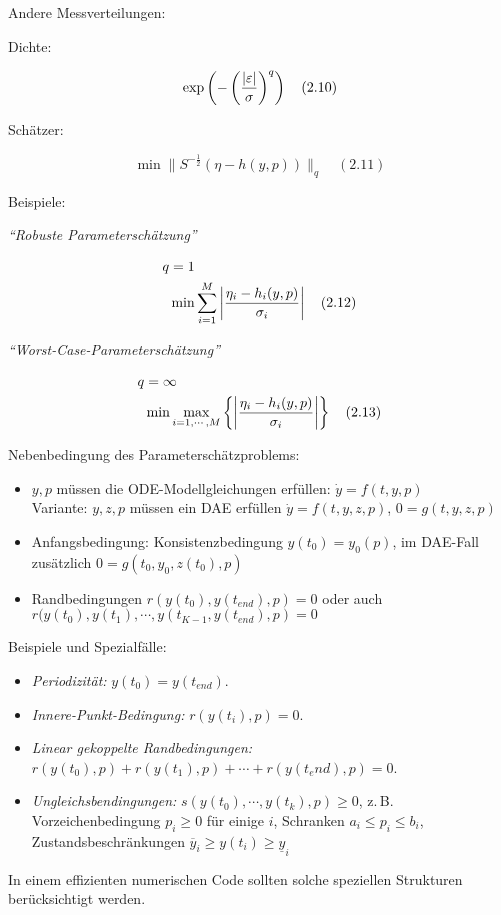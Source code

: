 Andere Messverteilungen:

Dichte:

\[\exp\left(-\left(\frac{|\varepsilon|}{\sigma}\right)^q\right) \quad (2.10)\]

Schätzer:

\[ \min \|S^{-\frac 12} (\eta-h(y,p)) \|_q \quad (2.11)\]

Beispiele:

\emph{"`Robuste Parameterschätzung"'}

\begin{align*}
q &= 1 \\
& \min \sum_{i=1}^M \left| \frac{\eta_i-h_i(y,p)}{\sigma_i} \right| \quad (2.12)
\end{align*}


\emph{"`Worst-Case-Parameterschätzung"'}

\begin{align*}
q &= \infty \\
& \min \max_{i=1,\cdots,M} \left\{ \left| \frac{\eta_i-h_i(y,p)}{\sigma_i} \right| \right\} \quad (2.13)
\end{align*}

Nebenbedingung des Parameterschätzproblems:

\begin{itemize}
\item $y,p$ müssen die ODE-Modellgleichungen erfüllen: $\dot y = f(t,y,p)$ \\
Variante: $y,z,p$ müssen ein DAE erfüllen $\dot y = f(t,y,z,p)$, $0=g(t,y,z,p)$
\item Anfangsbedingung: Konsistenzbedingung $y(t_0) = y_0(p)$, im DAE-Fall zusätzlich $0=g(t_0,y_0,z(t_0),p)$
\item Randbedingungen $r(y(t_0),y(t_{end}),p) = 0$ oder auch $r(y(t_0),y(t_1),\cdots,y(t_{K-1}, y(t_{end}),p) = 0$
\end{itemize}


Beispiele und Spezialfälle:

\begin{itemize}
\item \emph{Periodizität:} $y(t_0) = y(t_{end})$.
\item \emph{Innere-Punkt-Bedingung:} $r(y(t_i),p) = 0$.
\item \emph{Linear gekoppelte Randbedingungen:} $r(y(t_0),p) + r(y(t_1),p) + \cdots + r(y(t_end),p) = 0$.
\item \emph{Ungleichsbendingungen:} $s(y(t_0), \cdots, y(t_k), p) \geq 0$, z.\,B. Vorzeichenbedingung $p_i \geq 0$ für einige $i$, Schranken $a_i \leq p_i \leq b_i$, Zustandsbeschränkungen $\overline y_i \geq y(t_i) \geq \underline y_i$
\end{itemize}

In einem effizienten numerischen Code sollten solche speziellen Strukturen berücksichtigt werden.



